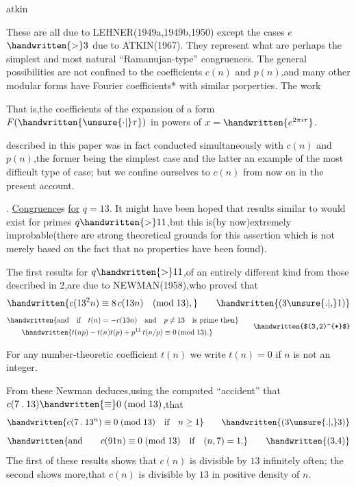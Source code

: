 \noindent\hfill atkin 

\noindent These are all due to LEHNER(1949a,1949b,1950) except the cases \uline{$e$}$\handwritten{>}3$ due to ATKIN(1967). They represent what are perhaps the simplest and most natural ``Ramanujan-type'' congruences. The general possibilities are not confined to the coefficients \uline{$c(n)$} and \uline{$p(n)$},and many other modular forms have Fourier coefficients* with similar porperties. The work

\noindent\handwritten{\rule{\linewidth}{0.4pt}}

\noindent *That is,the coefficients of the expansion of a form $F(\handwritten{\unsure{\cdot|}\tau})$ in powers of $x=\handwritten{e^{2\pi i\tau}}$.

\noindent\handwritten{\rule{\linewidth}{0.4pt}}

\noindent described in this paper was in fact conducted simultaneously with \uline{$c(n)$} and \uline{$p(n)$},the former being the simplest case and the latter an example of the most difficult type of case; but we confine ourselves to \uline{$c(n)$} from now on in the present account.

. \uline{Congruence}s \uline{for} $q=13$. It might have been hoped that results similar to  would exist for primes $q\handwritten{>}11$,but this is(by now)extremely improbable(there are strong theoretical grounds for this assertion which is not merely based on the fact that no properties have been found).

\noindent The first results for $q\handwritten{>}11$,of an entirely different kind from those described in \handwritten{\S}2,are due to NEWMAN(1958),who proved that
\[
\handwritten{c(13^{2}n)\equiv8\,c(13n)\quad(\mathrm{mod}\;13),}
\tag*{\handwritten{(3\unsure{.|,}1)}}
\]
\[
\begin{aligned}
&\handwritten{\text{and}\quad\text{if}\quad t(n)=-c(13n)\quad\text{and}\quad p\ne13\quad\text{is prime then}}\\
&\qquad\handwritten{t(np)-t(n)t(p)+p^{11}\,t(n/p)\equiv0\,(\mathrm{mod}\;13).}
\end{aligned}
\tag*{\handwritten{$(3,2)^{*}$}}
\]

\noindent\handwritten{\rule{\linewidth}{0.4pt}}

\noindent *For any number-theoretic coefficient \uline{$t(n)$} we write $t(n)=0$ if \uline{$n$} is not an integer.

\noindent\handwritten{\rule{\linewidth}{0.4pt}}

From these Newman deduces,using the computed ``accident'' that $c(7\mathbin{.}13)\handwritten{\equiv}0\;(\mathrm{mod}\;13)$,that
\[
\handwritten{c(7\mathbin{.}13^{n})\equiv0\;(\mathrm{mod}\;13)\quad \text{if}\quad n\geq1}
\tag*{\handwritten{(3\unsure{.|,}3)}}
\]
\[
\handwritten{\text{and}\qquad c(91n)\equiv0\;(\mathrm{mod}\;13)\quad \text{if}\quad(n,7)=1.}
\tag*{\handwritten{(3,4)}}
\]
The first of these results shows that \uline{$c(n)$} is divisible by $13$ infinitely often; the second shows more,that \uline{$c(n)$} is divisible by $13$ in positive density of \uline{$n$}.

